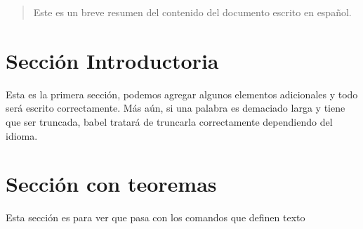 \documentclass{article}
\begin{document}
    \tableofcontents

    \vspace{2cm} %

    \begin{abstract}
        Este es un breve resumen del contenido del
        documento escrito en español.
    \end{abstract}


    \section{Sección Introductoria}
    Esta es la primera sección, podemos agregar
    algunos elementos adicionales y todo será
    escrito correctamente. Más aún, si una palabra
    es demaciado larga y tiene que ser truncada,
    babel tratará de truncarla correctamente
    dependiendo del idioma.


    \section{Sección con teoremas}
    Esta sección es para ver que pasa con los comandos
    que definen texto
\end{document}
